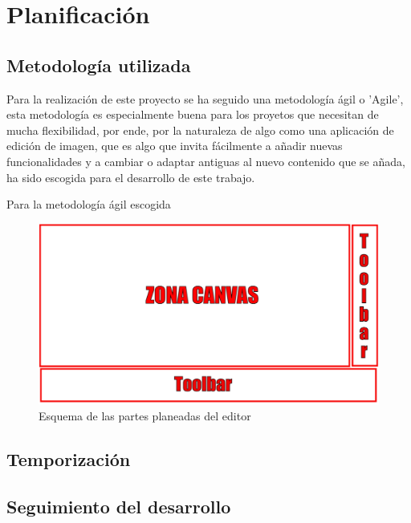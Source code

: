 \chapter{Planificación}

\section{Metodología utilizada}
    Para la realización de este proyecto se ha seguido una metodología ágil o 'Agile', esta metodología
    es especialmente buena para los proyetos que necesitan de mucha flexibilidad, por ende, por 
    la naturaleza de algo como una aplicación de edición de imagen, que es algo que invita fácilmente a añadir nuevas funcionalidades
    y a cambiar o adaptar antiguas al nuevo contenido que se añada, ha sido escogida para el desarrollo de este trabajo.

    Para la metodología ágil escogida 

    



    
  \begin{figure}[!h]
    \centering
    \includegraphics[scale=0.30]{img/ESQUEMA_ABSTRACTO.png}
    \caption{Esquema de las partes planeadas del editor}
  \end{figure}

\section{Temporización}
    


\section{Seguimiento del desarrollo}


